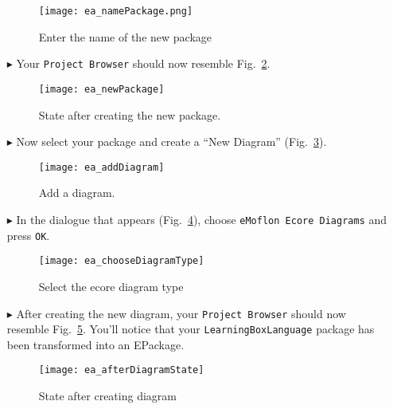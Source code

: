 \begin{itemize}
\begin{figure}[htbp]
	\centering
    \texttt{[image: ea\_namePackage.png]}
	\caption{Enter the name of the new package}
	\label{fig:new_package_name}
\end{figure}
\FloatBarrier

\vspace{1.0cm}

\item[$\blacktriangleright$] Your \texttt{Project Browser} should now resemble Fig.~\ref{fig:new_package_completed}.

\begin{figure}[htbp]
	\centering
  \texttt{[image: ea\_newPackage]}
	\caption{State after creating the new package.}
	\label{fig:new_package_completed}
\end{figure}
\FloatBarrier

\clearpage
\item[$\blacktriangleright$] Now select your package and create a ``New Diagram'' (Fig.~\ref{fig:diagram}).

\begin{figure}[htbp]
	\centering
  \texttt{[image: ea\_addDiagram]}
	\caption{Add a diagram.}
	\label{fig:diagram}
\end{figure}
\FloatBarrier

\item[$\blacktriangleright$] In the dialogue that appears (Fig.~\ref{fig:diagram_type}), choose \texttt{eMoflon Ecore Diagrams} and press \texttt{OK}. 

\begin{figure}[htbp]
	\centering
  \texttt{[image: ea\_chooseDiagramType]}
	\caption{Select the ecore diagram type}
	\label{fig:diagram_type}
\end{figure}
\FloatBarrier

 
\item[$\blacktriangleright$] After creating the new diagram, your  \texttt{Project Browser} should now resemble Fig.~\ref{fig:diagram_completed}. You'll notice
that your \texttt{LearningBoxLanguage} package has been transformed into an EPackage.

\begin{figure}[htbp]
	\centering
  \texttt{[image: ea\_afterDiagramState]}
	\caption{State after creating diagram}
	\label{fig:diagram_completed}
\end{figure}
\FloatBarrier


\end{itemize}
